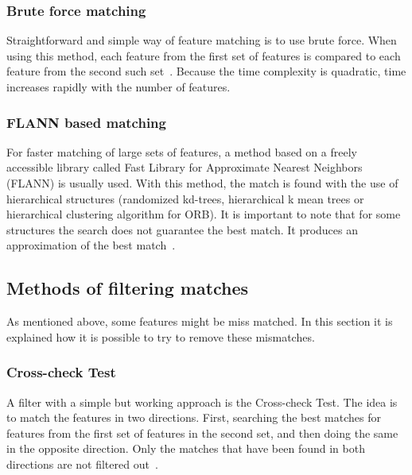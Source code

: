 \documentclass[thesis=B,english]{FITthesis}[2019/12/23]
\begin{document}
            \subsubsection*{Brute force matching}
                Straightforward and simple way of feature matching is to use brute force. When using this method, each feature from the first set of features is compared to each feature from the second such set~\cite{Mordvintsevc2013}. Because the time complexity is quadratic, time increases rapidly with the number of features.
                
            \subsubsection*{FLANN based matching}
                For faster matching of large sets of features, a method based on a freely accessible library called Fast Library for Approximate Nearest Neighbors (FLANN) is usually used. With this method, the match is found with the use of hierarchical structures (randomized kd-trees, hierarchical k mean trees or hierarchical clustering algorithm for ORB). It is important to note that for some structures the search does not guarantee the best match. It produces an approximation of the best match~\cite{6233169}.
                
        \subsection{Methods of filtering matches}
            As mentioned above, some features might be miss matched. In this section it is explained how it is possible to try to remove these mismatches.

            \subsubsection*{Cross-check Test}
                    A filter with a simple but working approach is the Cross-check Test. The idea is to match the features in two directions. First, searching the best matches for features from the first set of features in the second set, and then doing the same in the opposite direction. Only the matches that have been found in both directions are not filtered out~\cite{Mordvintsevc2013}.
                
\end{document}
